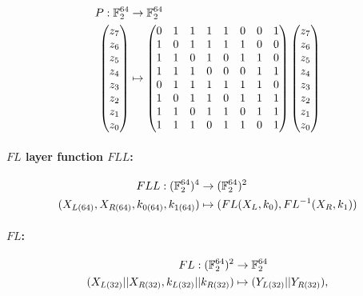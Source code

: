 \begin{align*}
    P:\mathbb{F}_2^{64} &\rightarrow \mathbb{F}_2^{64} \\
    \begin{pmatrix}z_7\\z_6\\z_5\\z_4\\z_3\\z_2\\z_1\\z_0\end{pmatrix}&\mapsto
    \begin{pmatrix}
        0 & 1 & 1 & 1 & 1 & 0 & 0 & 1 \\
        1 & 0 & 1 & 1 & 1 & 1 & 0 & 0 \\
        1 & 1 & 0 & 1 & 0 & 1 & 1 & 0 \\
        1 & 1 & 1 & 0 & 0 & 0 & 1 & 1 \\
        0 & 1 & 1 & 1 & 1 & 1 & 1 & 0 \\
        1 & 0 & 1 & 1 & 0 & 1 & 1 & 1 \\
        1 & 1 & 0 & 1 & 1 & 0 & 1 & 1 \\
        1 & 1 & 1 & 0 & 1 & 1 & 0 & 1
    \end{pmatrix}\begin{pmatrix}z_7\\z_6\\z_5\\z_4\\z_3\\z_2\\z_1\\z_0\end{pmatrix}
\end{align*}

\paragraph{$FL$ layer function $FLL$:}

\begin{align*}
    FLL:(\mathbb{F}_2^{64})^4 &\rightarrow (\mathbb{F}_2^{64})^2 \\
    (X_{L(64)},X_{R(64)},k_{0(64)},k_{1(64)})&\mapsto (FL(X_L,k_0),FL^{-1}(X_R,k_1))
\end{align*}

\paragraph{$FL$:}

\begin{align*}
    FL:(\mathbb{F}_2^{64})^2 &\rightarrow \mathbb{F}_2^{64} \\
    (X_{L(32)}||X_{R(32)},k_{L(32)}||k_{R(32)})&\mapsto (Y_{L(32)}||Y_{R(32)}),
\end{align*}

